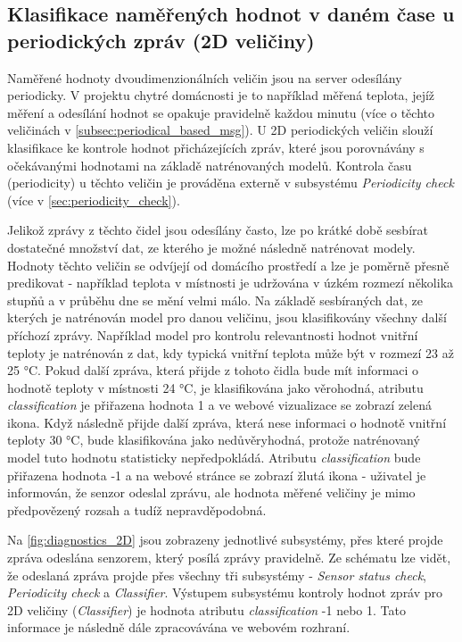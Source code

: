 \subsection{Klasifikace naměřených hodnot v daném čase u periodických zpráv (2D veličiny)} \label{subsec:2D_quantities}
Naměřené hodnoty dvoudimenzionálních veličin jsou na server odesílány periodicky. V projektu chytré domácnosti je to například měřená teplota, jejíž měření a odesílání hodnot se opakuje pravidelně každou minutu (více o těchto veličinách v \cref{subsec:periodical_based_msg}). U 2D periodických veličin slouží klasifikace ke kontrole hodnot přicházejících zpráv, které jsou porovnávány s očekávanými hodnotami na základě natrénovaných modelů. Kontrola času (periodicity) u těchto veličin je prováděna externě v subsystému \textit{Periodicity check} (více v \cref{sec:periodicity_check}). \par
Jelikož zprávy z těchto čidel jsou odesílány často, lze po krátké době sesbírat dostatečné množství dat, ze kterého je možné následně natrénovat modely. Hodnoty těchto veličin se odvíjejí od domácího prostředí a lze je poměrně přesně predikovat - například teplota v místnosti je udržována v úzkém rozmezí několika stupňů a v průběhu dne se mění velmi málo. Na základě sesbíraných dat, ze kterých je natrénován model pro danou veličinu, jsou klasifikovány všechny další příchozí zprávy. Například model pro kontrolu relevantnosti hodnot vnitřní teploty je natrénován z dat, kdy typická vnitřní teplota může být v rozmezí 23 až 25 \si{\degree}C. Pokud další zpráva, která přijde z tohoto čidla bude mít informaci o hodnotě teploty v místnosti 24 \si{\degree}C, je klasifikována jako věrohodná, atributu \textit{classification} je přiřazena hodnota 1 a ve webové vizualizace se zobrazí zelená ikona. Když následně přijde další zpráva, která nese informaci o hodnotě vnitřní teploty 30  \si{\degree}C, bude klasifikována jako nedůvěryhodná, protože natrénovaný model tuto hodnotu statisticky nepředpokládá. Atributu \textit{classification} bude přiřazena hodnota -1 a na webové stránce se zobrazí žlutá ikona - uživatel je informován, že senzor odeslal zprávu, ale hodnota měřené veličiny je mimo předpovězený rozsah a tudíž nepravděpodobná. \par
Na \cref{fig:diagnostics_2D} jsou zobrazeny jednotlivé subsystémy, přes které projde zpráva odeslána senzorem, který posílá zprávy pravidelně. Ze schématu lze vidět, že odeslaná zpráva projde přes všechny tři subsystémy - \textit{Sensor status check}, \textit{Periodicity check} a \textit{Classifier}. Výstupem subsystému kontroly hodnot zpráv pro 2D veličiny (\textit{Classifier}) je hodnota atributu \textit{classification} -1 nebo 1. Tato informace je následně dále zpracovávána ve webovém rozhraní. 


